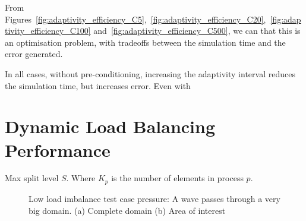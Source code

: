 From
Figures~\ref{fig:adaptivity_efficiency_C5},~\ref{fig:adaptivity_efficiency_C20},~\ref{fig:adaptivity_efficiency_C100}
and~\ref{fig:adaptivity_efficiency_C500}, we can that this is an optimisation problem, with
tradeoffs between the simulation time and the error generated.

In all cases, without pre-conditioning, increasing the adaptivity interval reduces the simulation
time, but increases error. Even with 

\section{Dynamic Load Balancing Performance}\label{section:results:load_balancing_performance}

Max split level  \(S\). Where  \(K_p\) is the number of elements in process  \(p\).

\begin{figure}[H]
	\centering
	\hfill
	\caption{Low load imbalance test case pressure: A wave passes through a very big domain. (a) Complete domain (b) Area of interest}\label{fig:load_imbalance_case_low_p}
\end{figure}

